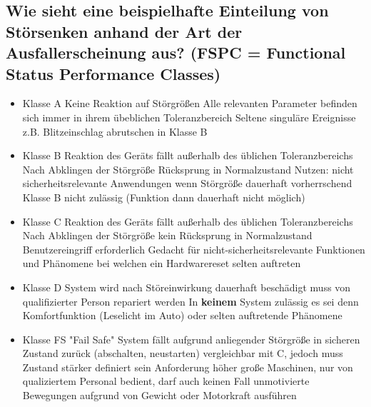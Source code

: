 \subsection{Wie sieht eine beispielhafte Einteilung von Störsenken anhand der Art der Ausfallerscheinung aus? (FSPC = Functional Status Performance Classes)}
\begin{itemize}
  \item Klasse A
    \subitem Keine Reaktion auf Störgrößen
    \subitem Alle relevanten Parameter befinden sich immer in ihrem übeblichen Toleranzbereich
    \subitem Seltene singuläre Ereignisse \m{\rightarrow} z.B. Blitzeinschlag \m{\rightarrow} abrutschen in Klasse B
  \item Klasse B
    \subitem Reaktion des Geräts fällt außerhalb des üblichen Toleranzbereichs
    \subitem Nach Abklingen der Störgröße \m{\rightarrow} Rücksprung in Normalzustand
    \subitem Nutzen: nicht sicherheitsrelevante Anwendungen \m{\rightarrow} wenn Störgröße dauerhaft vorherrschend \m{\rightarrow} Klasse B nicht zulässig (Funktion dann dauerhaft nicht möglich)
  \item Klasse C
    \subitem  Reaktion des Geräts fällt außerhalb des üblichen Toleranzbereichs
    \subitem Nach Abklingen der Störgröße \m{\rightarrow} kein Rücksprung in Normalzustand \m{\rightarrow}Benutzereingriff erforderlich
    \subitem Gedacht für nicht-sicherheitsrelevante Funktionen \m{\rightarrow} und Phänomene bei welchen ein Hardwarereset selten auftreten
  \item Klasse D
    \subitem System wird nach Störeinwirkung dauerhaft beschädigt \m{\rightarrow} muss von qualifizierter Person repariert werden
    \subitem In \textbf{keinem} System zulässig es sei denn \m{\rightarrow} Komfortfunktion (Leselicht im Auto) oder selten auftretende Phänomene
  \item Klasse FS
    \subitem "Fail Safe"
    \subitem System fällt aufgrund anliegender Störgröße in sicheren Zustand zurück (abschalten, neustarten)
    \subitem vergleichbar mit C, jedoch muss Zustand stärker definiert sein \m{\rightarrow} Anforderung höher
    \subitem große Maschinen, nur von qualiziertem Personal bedient, darf auch keinen Fall unmotivierte Bewegungen aufgrund von Gewicht oder Motorkraft ausführen
  \end{itemize}

\pagebreak